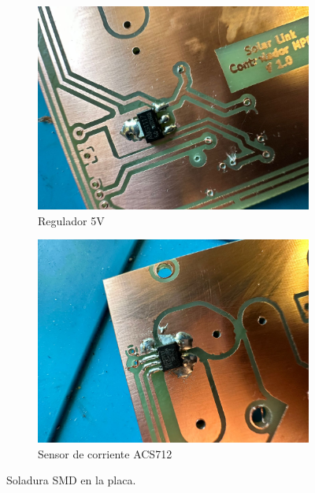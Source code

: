 \begin{figure}[h]

\begin{subfigure}{0.5\textwidth}
\includegraphics[width=0.9\linewidth]{MPPT/IMG_8867.JPG} 
\caption{Regulador 5V}
\label{fig:regulador12}
\end{subfigure}
\begin{subfigure}{0.5\textwidth}
\includegraphics[width=0.9\linewidth]{MPPT/IMG_8868.JPG}
\caption{Sensor de corriente ACS712}
\label{fig:sensor-corr}
\end{subfigure}

\caption{Soladura SMD en la placa.}
\label{fig:image2}
\end{figure}

